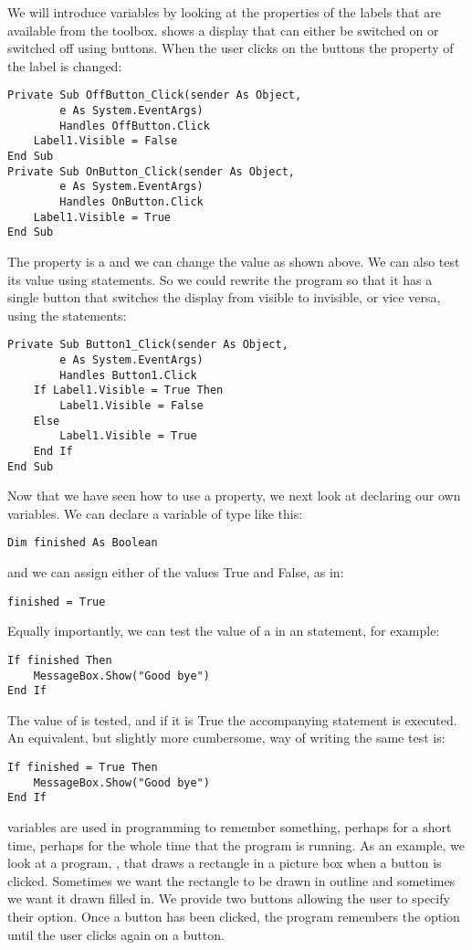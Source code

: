 		We will introduce  variables by looking at the properties of the labels that are available from the toolbox.  shows a display that can either be switched on or switched off using buttons. When the user clicks on the buttons the  property of the label is changed:
		\begin{lstlisting}
Private Sub OffButton_Click(sender As Object,
		e As System.EventArgs)
		Handles OffButton.Click
	Label1.Visible = False
End Sub
Private Sub OnButton_Click(sender As Object,
		e As System.EventArgs)
		Handles OnButton.Click
	Label1.Visible = True
End Sub
		\end{lstlisting}
		The  property is a  and we can change the value as shown above. We can also test its value using  statements. So we could rewrite the program so that it has a single button that switches the display from visible to invisible, or vice versa, using the statements:
		\begin{lstlisting}
Private Sub Button1_Click(sender As Object,
		e As System.EventArgs)
		Handles Button1.Click
	If Label1.Visible = True Then
		Label1.Visible = False
	Else
		Label1.Visible = True
	End If
End Sub
		\end{lstlisting}
		Now that we have seen how to use a  property, we next look at declaring our own  variables. We can declare a variable of type  like this:
		\begin{lstlisting}
Dim finished As Boolean
		\end{lstlisting}
		and we can assign either of the values True and False, as in:
		\begin{lstlisting}
finished = True
		\end{lstlisting}
		Equally importantly, we can test the value of a  in an  statement, for example:
		\begin{lstlisting}
If finished Then
	MessageBox.Show("Good bye")
End If
		\end{lstlisting}
		The value of  is tested, and if it is True the accompanying statement is executed. An equivalent, but slightly more cumbersome, way of writing the same test is:
		\begin{lstlisting}
If finished = True Then
	MessageBox.Show("Good bye")
End If
		\end{lstlisting}
		 variables are used in programming to remember something, perhaps for a short time, perhaps for the whole time that the program is running. As an example, we look at a program, , that draws a rectangle in a picture box when a button is clicked. Sometimes we want the rectangle to be drawn in outline and sometimes we want it drawn filled in. We provide two buttons allowing the user to specify their option. Once a button has been clicked, the program remembers the option until the user clicks again on a button.
		
